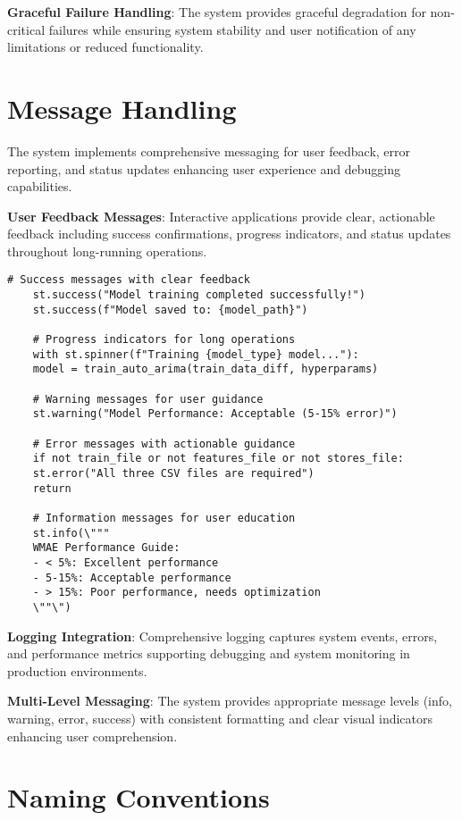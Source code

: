 \textbf{Graceful Failure Handling}: The system provides graceful degradation for non-critical failures while ensuring system stability and user notification of any limitations or reduced functionality.

\section{Message Handling}

The system implements comprehensive messaging for user feedback, error reporting, and status updates enhancing user experience and debugging capabilities.

\textbf{User Feedback Messages}: Interactive applications provide clear, actionable feedback including success confirmations, progress indicators, and status updates throughout long-running operations.

\begin{lstlisting}[style=bashstyle, caption={User Message and Feedback System}]
	# Success messages with clear feedback
	st.success("Model training completed successfully!")
	st.success(f"Model saved to: {model_path}")
	
	# Progress indicators for long operations
	with st.spinner(f"Training {model_type} model..."):
	model = train_auto_arima(train_data_diff, hyperparams)
	
	# Warning messages for user guidance
	st.warning("Model Performance: Acceptable (5-15% error)")
	
	# Error messages with actionable guidance
	if not train_file or not features_file or not stores_file:
	st.error("All three CSV files are required")
	return
	
	# Information messages for user education
	st.info(\"""
	WMAE Performance Guide:
	- < 5%: Excellent performance
	- 5-15%: Acceptable performance  
	- > 15%: Poor performance, needs optimization
	\""\")
\end{lstlisting}

\textbf{Logging Integration}: Comprehensive logging captures system events, errors, and performance metrics supporting debugging and system monitoring in production environments.

\textbf{Multi-Level Messaging}: The system provides appropriate message levels (info, warning, error, success) with consistent formatting and clear visual indicators enhancing user comprehension.

\section{Naming Conventions}

